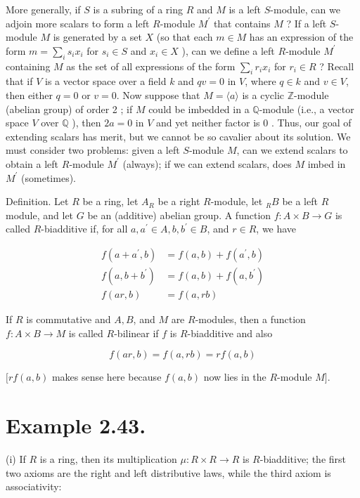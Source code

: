 \documentclass[10pt]{article}
\begin{document}
More generally, if $S$ is a subring of a ring $R$ and $M$ is a left $S$-module, can we adjoin more scalars to form a left $R$-module $M^{\prime}$ that contains $M$ ? If a left $S$-module $M$ is generated by a set $X$ (so that each $m \in M$ has an expression of the form $m=\sum_{i} s_{i} x_{i}$ for $s_{i} \in S$ and $x_{i} \in X$ ), can we define a left $R$-module $M^{\prime}$ containing $M$ as the set of all expressions of the form $\sum_{i} r_{i} x_{i}$ for $r_{i} \in R$ ? Recall that if $V$ is a vector space over a field $k$ and $q v=0$ in $V$, where $q \in k$ and $v \in V$, then either $q=0$ or $v=0$. Now suppose that $M=\langle a\rangle$ is a cyclic $\mathbb{Z}$-module (abelian group) of order 2 ; if $M$ could be imbedded in a $\mathbb{Q}$-module (i.e., a vector space $V$ over $\mathbb{Q}$ ), then $2 a=0$ in $V$ and yet neither factor is 0 . Thus, our goal of extending scalars has merit, but we cannot be so cavalier about its solution. We must consider two problems: given a left $S$-module $M$, can we extend scalars to obtain a left $R$-module $M^{\prime}$ (always); if we can extend scalars, does $M$ imbed in $M^{\prime}$ (sometimes).

Definition. Let $R$ be a ring, let $A_{R}$ be a right $R$-module, let ${ }_{R} B$ be a left $R$ module, and let $G$ be an (additive) abelian group. A function $f: A \times B \rightarrow G$ is called $R$-biadditive if, for all $a, a^{\prime} \in A, b, b^{\prime} \in B$, and $r \in R$, we have

$$
\begin{aligned}
f\left(a+a^{\prime}, b\right) & =f(a, b)+f\left(a^{\prime}, b\right) \\
f\left(a, b+b^{\prime}\right) & =f(a, b)+f\left(a, b^{\prime}\right) \\
f(a r, b) & =f(a, r b)
\end{aligned}
$$

If $R$ is commutative and $A, B$, and $M$ are $R$-modules, then a function $f: A \times B \rightarrow M$ is called $R$-bilinear if $f$ is $R$-biadditive and also

$$
f(a r, b)=f(a, r b)=r f(a, b)
$$

$[r f(a, b)$ makes sense here because $f(a, b)$ now lies in the $R$-module $M]$.

\section*{Example 2.43.}
(i) If $R$ is a ring, then its multiplication $\mu: R \times R \rightarrow R$ is $R$-biadditive; the first two axioms are the right and left distributive laws, while the third axiom is associativity:
\end{document}
